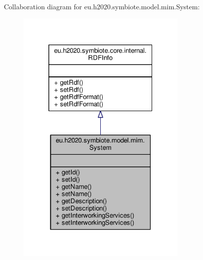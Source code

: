 Collaboration diagram for eu.\+h2020.\+symbiote.\+model.\+mim.\+System\+:\nopagebreak
\begin{figure}[H]
\begin{center}
\leavevmode
\includegraphics[width=236pt]{classeu_1_1h2020_1_1symbiote_1_1model_1_1mim_1_1System__coll__graph}
\end{center}
\end{figure}
